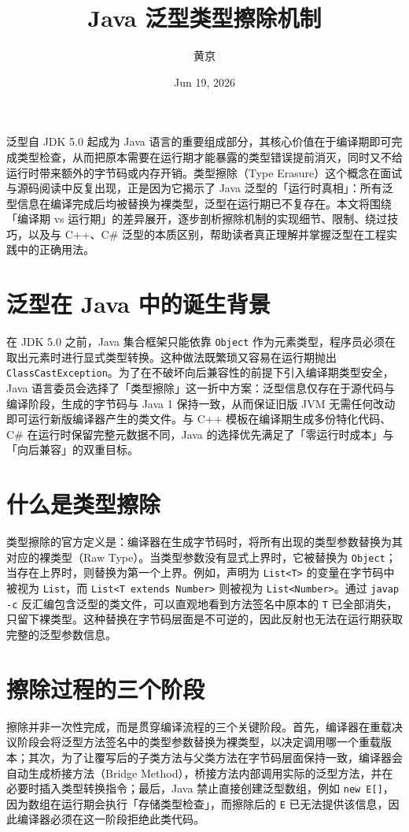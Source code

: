 \title{Java 泛型类型擦除机制}
\author{黄京}
\date{Jun 19, 2026}
\maketitle
泛型自 JDK 5.0 起成为 Java 语言的重要组成部分，其核心价值在于编译期即可完成类型检查，从而把原本需要在运行期才能暴露的类型错误提前消灭，同时又不给运行时带来额外的字节码或内存开销。类型擦除（Type Erasure）这个概念在面试与源码阅读中反复出现，正是因为它揭示了 Java 泛型的「运行时真相」：所有泛型信息在编译完成后均被替换为裸类型，泛型在运行期已不复存在。本文将围绕「编译期 vs 运行期」的差异展开，逐步剖析擦除机制的实现细节、限制、绕过技巧，以及与 C++、C\#{} 泛型的本质区别，帮助读者真正理解并掌握泛型在工程实践中的正确用法。\par
\chapter{泛型在 Java 中的诞生背景}
在 JDK 5.0 之前，Java 集合框架只能依靠 \texttt{Object} 作为元素类型，程序员必须在取出元素时进行显式类型转换。这种做法既繁琐又容易在运行期抛出 \texttt{ClassCastException}。为了在不破坏向后兼容性的前提下引入编译期类型安全，Java 语言委员会选择了「类型擦除」这一折中方案：泛型信息仅存在于源代码与编译阶段，生成的字节码与 Java 1 保持一致，从而保证旧版 JVM 无需任何改动即可运行新版编译器产生的类文件。与 C++ 模板在编译期生成多份特化代码、C\#{} 在运行时保留完整元数据不同，Java 的选择优先满足了「零运行时成本」与「向后兼容」的双重目标。\par
\chapter{什么是类型擦除}
类型擦除的官方定义是：编译器在生成字节码时，将所有出现的类型参数替换为其对应的裸类型（Raw Type）。当类型参数没有显式上界时，它被替换为 \texttt{Object}；当存在上界时，则替换为第一个上界。例如，声明为 \texttt{List<T>} 的变量在字节码中被视为 \texttt{List}，而 \texttt{List<T extends Number>} 则被视为 \texttt{List<Number>}。通过 \texttt{javap -c} 反汇编包含泛型的类文件，可以直观地看到方法签名中原本的 \texttt{T} 已全部消失，只留下裸类型。这种替换在字节码层面是不可逆的，因此反射也无法在运行期获取完整的泛型参数信息。\par
\chapter{擦除过程的三个阶段}
擦除并非一次性完成，而是贯穿编译流程的三个关键阶段。首先，编译器在重载决议阶段会将泛型方法签名中的类型参数替换为裸类型，以决定调用哪一个重载版本；其次，为了让覆写后的子类方法与父类方法在字节码层面保持一致，编译器会自动生成桥接方法（Bridge Method），桥接方法内部调用实际的泛型方法，并在必要时插入类型转换指令；最后，Java 禁止直接创建泛型数组，例如 \texttt{new E[]}，因为数组在运行期会执行「存储类型检查」，而擦除后的 \texttt{E} 已无法提供该信息，因此编译器必须在这一阶段拒绝此类代码。\par
